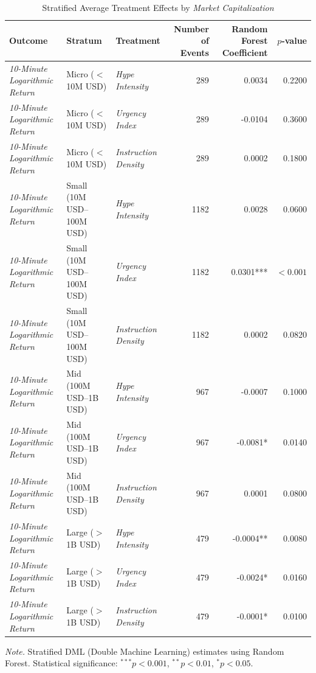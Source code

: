 \begin{table}[htbp]
    \centering
    \caption{Stratified Average Treatment Effects by \textit{Market Capitalization}}
    \label{tab:stratified_ate}
    \small
    \begin{tabular}{l l l r r r}
    \toprule
    Outcome & Stratum & Treatment & Number of Events & Random Forest Coefficient & $p$-value \\
    \midrule
    \textit{10-Minute Logarithmic Return} & Micro ($<$10M USD) & \textit{Hype Intensity} & 289 & 0.0034 & 0.2200 \\
\textit{10-Minute Logarithmic Return} & Micro ($<$10M USD) & \textit{Urgency Index} & 289 & -0.0104 & 0.3600 \\
\textit{10-Minute Logarithmic Return} & Micro ($<$10M USD) & \textit{Instruction Density} & 289 & 0.0002 & 0.1800 \\
\textit{10-Minute Logarithmic Return} & Small (10M USD--100M USD) & \textit{Hype Intensity} & 1182 & 0.0028 & 0.0600 \\
\textit{10-Minute Logarithmic Return} & Small (10M USD--100M USD) & \textit{Urgency Index} & 1182 & 0.0301*** & $<0.001$ \\
\textit{10-Minute Logarithmic Return} & Small (10M USD--100M USD) & \textit{Instruction Density} & 1182 & 0.0002 & 0.0820 \\
\textit{10-Minute Logarithmic Return} & Mid (100M USD--1B USD) & \textit{Hype Intensity} & 967 & -0.0007 & 0.1000 \\
\textit{10-Minute Logarithmic Return} & Mid (100M USD--1B USD) & \textit{Urgency Index} & 967 & -0.0081* & 0.0140 \\
\textit{10-Minute Logarithmic Return} & Mid (100M USD--1B USD) & \textit{Instruction Density} & 967 & 0.0001 & 0.0800 \\
\textit{10-Minute Logarithmic Return} & Large ($>$1B USD) & \textit{Hype Intensity} & 479 & -0.0004** & 0.0080 \\
\textit{10-Minute Logarithmic Return} & Large ($>$1B USD) & \textit{Urgency Index} & 479 & -0.0024* & 0.0160 \\
\textit{10-Minute Logarithmic Return} & Large ($>$1B USD) & \textit{Instruction Density} & 479 & -0.0001* & 0.0100 \\
\bottomrule
    \end{tabular}
    \vspace{2mm}
    \footnotesize
    \textit{Note.} Stratified DML (Double Machine Learning) estimates using Random Forest. 
    Statistical significance: $^{***}p<0.001$, $^{**}p<0.01$, $^{*}p<0.05$.
    \end{table}
    
